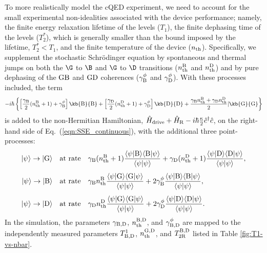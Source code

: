 To more realistically model the cQED experiment, we need to account
for the small experimental non-idealities associated with the device
performance; namely, the finite energy relaxation lifetime of the
levels ($T_{1}$), the finite dephasing time of the levels ($T_{2}^{*}$),
which is generally smaller than the bound imposed by the lifetime,
$T_{2}^{*}<T_{1}$, and the finite temperature of the device ($n_{{\rm th}}$).
Specifically, we supplement the stochastic Schrödinger equation by
spontaneous and thermal jumps on both the $\G$ to $\B$ and $\G$
to $\D$ transitions ($n_{{\rm th}}^{{\rm B}}$ and $n_{{\rm th}}^{{\rm D}}$)
and by pure dephasing of the ${\rm GB}$ and ${\rm GD}$ coherences
($\gamma_{{\rm B}}^{\phi}$ and $\gamma_{{\rm D}}^{\phi}$). With
these processes included, the term 
\[
-i\hbar\left\{ \left[\frac{\gamma_{{\rm B}}}{2}(n_{{\rm th}}^{{\rm B}}+1)+\gamma_{{\rm B}}^{\phi}\right]\kb{\rm B}{\rm B}+\left[\frac{\gamma_{{\rm D}}}{2}(n_{{\rm th}}^{{\rm D}}+1)+\gamma_{{\rm D}}^{\phi}\right]\kb{\rm D}{\rm D}+\frac{\gamma_{{\rm B}}n_{{\rm th}}^{{\rm B}}+\gamma_{{\rm D}}n_{{\rm th}}^{{\rm D}}}{2}|\kb{\rm G}{\rm G}\right\} 
\]
is added to the non-Hermitian Hamiltonian, $\hat{H}_{{\rm drive}}+\hat{H}_{{\rm R}}-i\hbar\frac{\kappa}{2}\hat{c}^{\dagger}\hat{c}$,
on the right-hand side of Eq.~(\ref{eqn:SSE_continuous}), with the
additional three point-processes: 
\begin{align}
|\psi\rangle\to|{\rm G}\rangle & \quad\text{at rate}\quad\gamma_{{\rm B}}(n_{{\rm th}}^{{\rm B}}+1)\frac{\langle\psi|{\rm B}\rangle\langle{\rm B}|\psi\rangle}{\langle\psi|\psi\rangle}+\gamma_{{\rm D}}(n_{{\rm th}}^{{\rm D}}+1)\frac{\langle\psi|{\rm D}\rangle\langle{\rm D}|\psi\rangle}{\langle\psi|\psi\rangle},\\
\noalign{\vskip4pt}|\psi\rangle\to|{\rm B}\rangle & \quad\text{at rate}\quad\gamma_{{\rm B}}n_{{\rm th}}^{{\rm B}}\frac{\langle\psi|{\rm G}\rangle\langle{\rm G}|\psi\rangle}{\langle\psi|\psi\rangle}+2\gamma_{{\rm B}}^{\phi}\frac{\langle\psi|{\rm B}\rangle\langle{\rm B}|\psi\rangle}{\langle\psi|\psi\rangle},\\
\noalign{\vskip4pt}|\psi\rangle\to|{\rm D}\rangle & \quad\text{at rate}\quad\gamma_{{\rm D}}n_{{\rm th}}^{{\rm D}}\frac{\langle\psi|{\rm G}\rangle\langle{\rm G}|\psi\rangle}{\langle\psi|\psi\rangle}+2\gamma_{{\rm D}}^{\phi}\frac{\langle\psi|{\rm D}\rangle\langle{\rm D}|\psi\rangle}{\langle\psi|\psi\rangle}.
\end{align}
In the simulation, the parameters $\gamma_{{\rm B,D}}$, $n_{{\rm th}}^{{\rm B,D}}$,
and $\gamma_{{\rm B,D}}^{\phi}$ are mapped to the independently measured
parameters $T_{{\rm B,D}}^{1}$, $n_{{\rm th}}^{{\rm G,D}}$, and
$T_{2{\rm R}}^{{\rm B,D}}$ listed in Table \ref{fig:T1-vs-nbar}.

